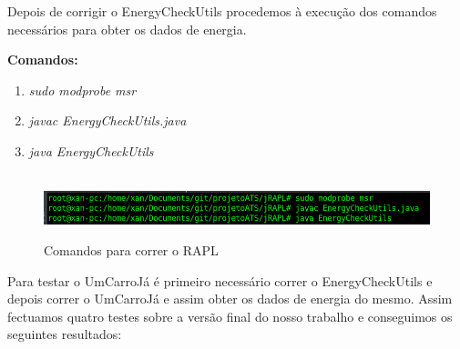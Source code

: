 Depois de corrigir o EnergyCheckUtils procedemos à execução dos comandos necessários para obter os dados de energia.\newline
 \par\textbf{Comandos:}

 \begin{enumerate}
 \item \textit{sudo modprobe msr}
 \item \textit{javac EnergyCheckUtils.java} 
 \item \textit{java EnergyCheckUtils}
\end{enumerate}


\begin{figure}[H]
    \hbox{\hspace{-8em} \includegraphics[width=1.5\textwidth]{images/rapl_run.png}}
    \label{fig51}
    \caption{Comandos para correr o RAPL}
\end{figure}

Para testar o UmCarroJá é primeiro necessário correr o EnergyCheckUtils e depois correr o UmCarroJá e assim obter os dados de energia do mesmo. Assim fectuamos quatro testes sobre a versão final do nosso trabalho e conseguimos os seguintes resultados:

